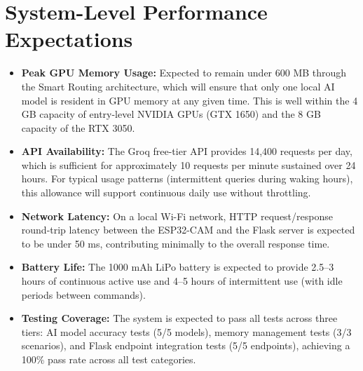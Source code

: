 \section{System-Level Performance Expectations}
\begin{itemize}[leftmargin=1.5cm]
\item \textbf{Peak GPU Memory Usage:} Expected to remain under 600 MB through the Smart Routing architecture, which will ensure that only one local AI model is resident in GPU memory at any given time. This is well within the 4 GB capacity of entry-level NVIDIA GPUs (GTX 1650) and the 8 GB capacity of the RTX 3050.

\item \textbf{API Availability:} The Groq free-tier API provides 14,400 requests per day, which is sufficient for approximately 10 requests per minute sustained over 24 hours. For typical usage patterns (intermittent queries during waking hours), this allowance will support continuous daily use without throttling.

\item \textbf{Network Latency:} On a local Wi-Fi network, HTTP request/response round-trip latency between the ESP32-CAM and the Flask server is expected to be under 50 ms, contributing minimally to the overall response time.

\item \textbf{Battery Life:} The 1000 mAh LiPo battery is expected to provide 2.5--3 hours of continuous active use and 4--5 hours of intermittent use (with idle periods between commands).

\item \textbf{Testing Coverage:} The system is expected to pass all tests across three tiers: AI model accuracy tests (5/5 models), memory management tests (3/3 scenarios), and Flask endpoint integration tests (5/5 endpoints), achieving a 100\% pass rate across all test categories.
\end{itemize}
